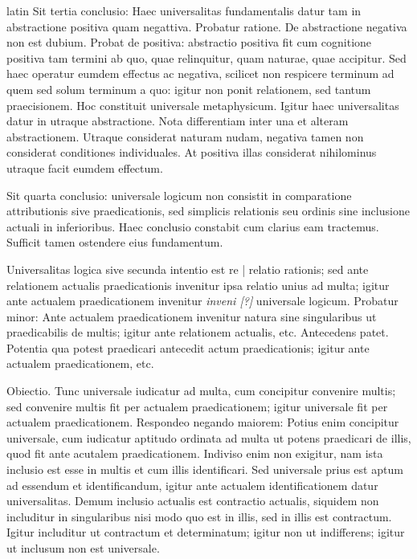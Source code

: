 \begin{otherlanguage*}{latin}
\pstart
  Sit tertia conclusio: Haec universalitas fundamentalis datur tam in abstractione positiva quam negattiva. Probatur ratione. De abstractione negativa non est dubium. Probat de positiva: abstractio positiva fit cum cognitione positiva tam termini ab quo, quae relinquitur, quam naturae, quae accipitur. Sed haec operatur eumdem effectus ac negativa, scilicet non respicere terminum ad quem sed solum terminum a quo: igitur non ponit relationem, sed tantum praecisionem. Hoc constituit universale metaphysicum. Igitur haec universalitas datur in utraque abstractione. Nota differentiam inter una et alteram abstractionem. Utraque considerat naturam nudam, negativa tamen non considerat conditiones individuales. At positiva illas considerat nihilominus utraque facit eumdem effectum. 
\pend

\pstart
  Sit quarta conclusio: universale logicum non consistit in comparatione attributionis sive praedicationis, sed simplicis relationis seu ordinis sine inclusione actuali in inferioribus. Haec conclusio constabit cum clarius eam tractemus. Sufficit tamen ostendere eius fundamentum. 
\pend

\pstart
  Universalitas logica sive secunda intentio est re \textnormal{|}    relatio rationis; sed ante relationem actualis praedicationis invenitur ipsa relatio unius ad multa; igitur ante actualem praedicationem invenitur \emph{inveni [?]} universale logicum. Probatur minor: Ante actualem praedicationem invenitur natura sine singularibus ut praedicabilis de multis; igitur ante relationem actualis, etc. Antecedens patet. Potentia qua potest praedicari antecedit actum praedicationis; igitur ante actualem praedicationem, etc. 
\pend

\pstart
  Obiectio. Tunc universale iudicatur ad multa, cum concipitur convenire multis; sed convenire multis fit per actualem praedicationem; igitur universale fit per actualem praedicationem. Respondeo negando maiorem: Potius enim concipitur universale, cum iudicatur aptitudo ordinata ad multa ut potens praedicari de illis, quod fit ante acutalem praedicationem. Indiviso enim non exigitur, nam ista inclusio est esse in multis et cum illis identificari. Sed universale prius est aptum ad essendum et identificandum, igitur ante actualem identificationem datur universalitas. Demum inclusio actualis est contractio actualis, siquidem non includitur in singularibus nisi modo quo est in illis, sed in illis est contractum. Igitur includitur ut contractum et determinatum; igitur non ut indifferens; igitur ut inclusum non est universale. 
\pend


\end{otherlanguage*}
